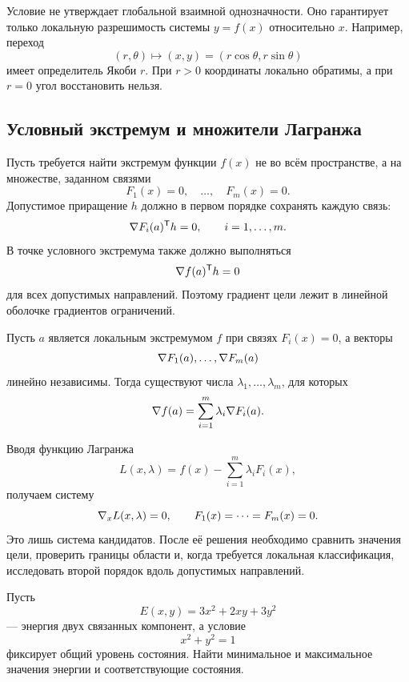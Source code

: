 Условие не утверждает глобальной взаимной однозначности. Оно гарантирует только локальную разрешимость системы \(y=f(x)\) относительно \(x\). Например, переход
\[
(r,\theta)
\longmapsto
(x,y)
=
(r\cos\theta,r\sin\theta)
\]
имеет определитель Якоби \(r\). При \(r>0\) координаты локально обратимы, а при \(r=0\) угол восстановить нельзя.

\subsection{Условный экстремум и множители Лагранжа}

Пусть требуется найти экстремум функции \(f(x)\) не во всём пространстве, а на множестве, заданном связями
\[
F_1(x)=0,
\quad\dots,\quad
F_m(x)=0.
\]
Допустимое приращение \(h\) должно в первом порядке сохранять каждую связь:
\[
\nabla F_i(a)^{\mathsf{T}}h=0,
\qquad i=1,\dots,m.
\]
В точке условного экстремума также должно выполняться
\[
\nabla f(a)^{\mathsf{T}}h=0
\]
для всех допустимых направлений. Поэтому градиент цели лежит в линейной оболочке градиентов ограничений.

\begin{theorem}
Пусть \(a\) является локальным экстремумом \(f\) при связях \(F_i(x)=0\), а векторы
\[
\nabla F_1(a),\dots,\nabla F_m(a)
\]
линейно независимы. Тогда существуют числа \(\lambda_1,\dots,\lambda_m\), для которых
\begin{equation}
\nabla f(a)
=
\sum_{i=1}^m\lambda_i\nabla F_i(a).
\label{eq:lagrange-gradient}
\end{equation}
\end{theorem}

Вводя функцию Лагранжа
\[
L(x,\lambda)
=
f(x)-\sum_{i=1}^m\lambda_iF_i(x),
\]
получаем систему
\[
\nabla_x L(x,\lambda)=0,
\qquad
F_1(x)=\cdots=F_m(x)=0.
\]
Это лишь система кандидатов. После её решения необходимо сравнить значения цели, проверить границы области и, когда требуется локальная классификация, исследовать второй порядок вдоль допустимых направлений.

\begin{problem}
Пусть
\[
E(x,y)=3x^2+2xy+3y^2
\]
--- энергия двух связанных компонент, а условие
\[
x^2+y^2=1
\]
фиксирует общий уровень состояния. Найти минимальное и максимальное значения энергии и соответствующие состояния.
\end{problem}


